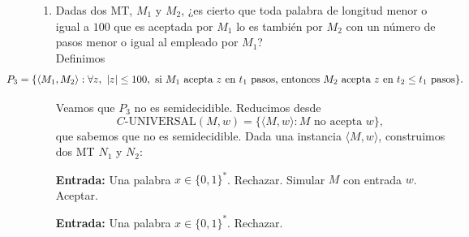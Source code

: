 \documentclass[12pt]{article}
\begin{document}
\begin{ejercicio}[2.4 puntos]
\begin{enumerate}
            Si $M$ no acepta alguna palabra $w_i$ de longitud menor o igual que $10$, entonces, elijamos los tiempos que elijamos,
            $M$ no aceptará esa palabra en esos pasos, y ninguna rama podrá aceptar. \\

            Por tanto, $P_2$ es semidecidible pero no decidible.

            \item Dadas dos MT, $M_1$ y $M_2$, ¿es cierto que toda palabra de longitud menor o igual a $100$ que es aceptada por $M_1$ lo es 
            también por $M_2$ con un número de pasos menor o igual al empleado por $M_1$? \\

            Definimos
            $$
            \hspace{-1.7cm}P_3=\{\langle M_1,M_2\rangle : \forall z,\ |z|\leq 100,\ 
            \text{si } M_1 \text{ acepta } z \text{ en } t_1 \text{ pasos, entonces } M_2
            \text{ acepta } z \text{ en } t_2\leq t_1 \text{ pasos}\}.
            $$

            Veamos que $P_3$ no es semidecidible. Reducimos desde
            $$
            C\text{-UNIVERSAL}(M,w)=\{\langle M,w\rangle : M \text{ no acepta } w\},
            $$
            que sabemos que no es semidecidible. Dada una instancia $\langle M,w\rangle$,
            construimos dos MT $N_1$ y $N_2$:

            \begin{algorithm}
            \caption{MT $N_1$}
            \label{algorithm:N1-p3-corto}
            \begin{algorithmic}
            \State \textbf{Entrada:} Una palabra $x\in\{0,1\}^*$.
            \If{$x\neq \varepsilon$}
                \State Rechazar.
            \EndIf
            \State Simular $M$ con entrada $w$.
                \State Aceptar.
            \EndIf
            \end{algorithmic}
            \end{algorithm}

            \begin{algorithm}
            \caption{MT $N_2$}
            \label{algorithm:N2-p3-corto}
            \begin{algorithmic}
            \State \textbf{Entrada:} Una palabra $x\in\{0,1\}^*$.
            \State Rechazar.
            \end{algorithmic}
            \end{algorithm}


\end{enumerate}
\end{ejercicio}
\end{document}
